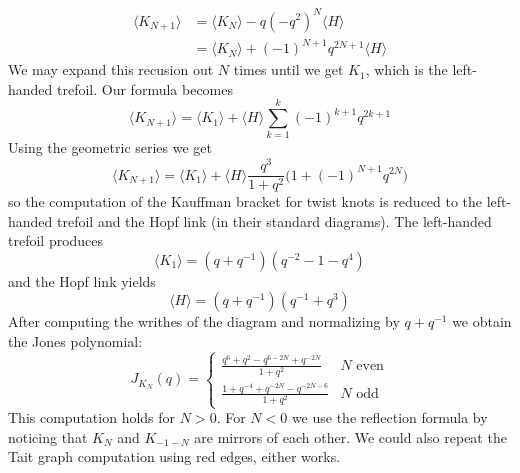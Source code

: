            \begin{align}
                \langle{K_{N+1}}\rangle
                &=\langle{K_{N}}\rangle
                -q(-q^{2})^{N}\langle{H}\rangle\\
                &=\langle{K_{N}}\rangle
                +(-1)^{N+1}q^{2N+1}\langle{H}\rangle
            \end{align}
            We may expand this recusion out $N$ times until we get $K_{1}$,
            which is the left-handed trefoil. Our formula becomes
            \begin{equation}
                \langle{K_{N+1}}\rangle
                =\langle{K_{1}}\rangle
                +\langle{H}\rangle
                \sum_{k=1}^{k}(-1)^{k+1}q^{2k+1}
            \end{equation}
            Using the geometric series we get
            \begin{equation}
                \langle{K_{N+1}}\rangle
                =\langle{K_{1}}\rangle+\langle{H}\rangle
                \frac{q^{3}}{1+q^{2}}\big(1+(-1)^{N+1}q^{2N}\big)
            \end{equation}
            so the computation of the Kauffman bracket for twist knots is
            reduced to the left-handed trefoil and the Hopf link (in their
            standard diagrams). The left-handed trefoil produces
            \begin{equation}
                \langle{K_{1}}\rangle=(q+q^{-1})(q^{-2}-1-q^{4})
            \end{equation}
            and the Hopf link yields
            \begin{equation}
                \langle{H}\rangle=
                (q+q^{-1})(q^{-1}+q^{3})
            \end{equation}
            After computing the writhes of the diagram and normalizing
            by $q+q^{-1}$ we obtain the Jones polynomial:
            \begin{equation}
                J_{K_{N}}(q)
                =\begin{cases}
                    \frac{q^{6}+q^{2}-q^{6-2N}+q^{-2N}}{1+q^{2}}
                    &N\textrm{ even}\\
                    \frac{1+q^{-4}+q^{-2N}-q^{-2N-6}}{1+q^{2}}
                    &N\textrm{ odd}
                \end{cases}
            \end{equation}
            This computation holds for $N>0$. For $N<0$ we use the
            reflection formula by noticing that $K_{N}$ and $K_{-1-N}$ are
            mirrors of each other. We could also repeat the Tait graph
            computation using red edges, either works.
